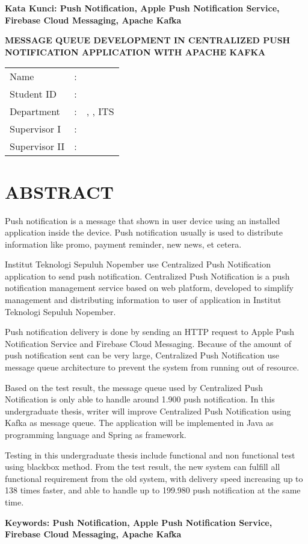 \vspace*{1em}
\noindent\bfseries Kata Kunci: Push Notification, Apple Push Notification Service, Firebase Cloud Messaging, Apache Kafka
\normalfont
\cleardoublepage

\begin{center}
	\noindent\textbf{\MakeUppercase{Message Queue Development in Centralized Push Notification Application with Apache Kafka}}
\end{center}
\vspace*{1em}

\noindent\begin{tabularx}{\linewidth}{l l X}
	Name 			& : & \penulis \\
	Student ID		& :	& \nrp \\
	Department 		& : & \jurusaneng, \newline \fakultaseng, ITS \\
	Supervisor I 	& : & \pembimbingsatu \\
	Supervisor II 	& : & \pembimbingdua
\end {tabularx}

{\let\clearpage\relax\titlespacing{\chapter}{0em}{0em}{1em} \chapter{ABSTRACT}}
\itshape
\par Push notification is a message that shown in user device using an installed application inside the device. Push notification usually is used to distribute information like promo, payment reminder, new news, et cetera.
\par Institut Teknologi Sepuluh Nopember use Centralized Push Notification application to send push notification. Centralized Push Notification is a push notification management service based on web platform, developed to simplify management and distributing information to user of application in Institut Teknologi Sepuluh Nopember.
\par Push notification delivery is done by sending an HTTP request to Apple Push Notification Service and Firebase Cloud Messaging. Because of the amount of push notification sent can be very large, Centralized Push Notification use message queue architecture to prevent the system from running out of resource.
\par Based on the test result, the message queue used by Centralized Push Notification is only able to handle around 1.900 push notification. In this undergraduate thesis, writer will improve Centralized Push Notification using Kafka as message queue. The application will be implemented in Java as programming language and Spring as framework.
\par Testing in this undergraduate thesis include functional and non functional test using blackbox method. From the test result, the new system can fulfill all functional requirement from the old system, with delivery speed increasing up to 138 times faster, and able to handle up to 199.980 push notification at the same time.

\vspace*{1em}
\noindent\bfseries Keywords: Push Notification, Apple Push Notification Service, Firebase Cloud Messaging, Apache Kafka
\normalfont
\cleardoublepage